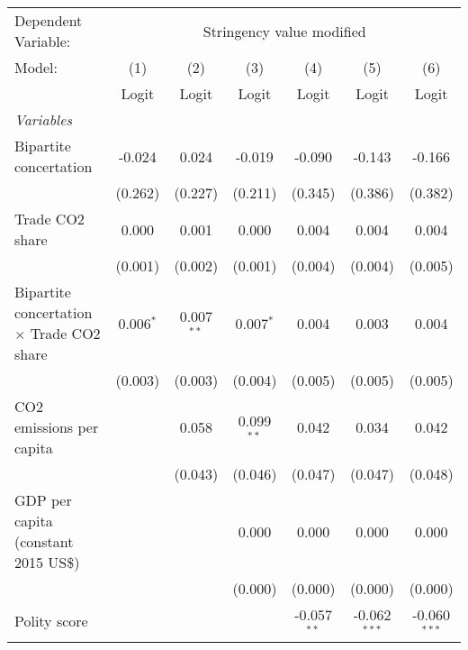 
\begingroup
\centering
\begin{tabular}{lcccccc}
   \toprule
   Dependent Variable: & \multicolumn{6}{c}{Stringency value modified}\\
   Model:                                           & (1)         & (2)          & (3)          & (4)           & (5)            & (6)\\  
                                                    &  Logit      & Logit        & Logit        & Logit         & Logit          & Logit\\  
   \midrule
   \emph{Variables}\\
   Bipartite concertation                           & -0.024      & 0.024        & -0.019       & -0.090        & -0.143         & -0.166\\   
                                                    & (0.262)     & (0.227)      & (0.211)      & (0.345)       & (0.386)        & (0.382)\\   
   Trade CO2 share                                  & 0.000       & 0.001        & 0.000        & 0.004         & 0.004          & 0.004\\   
                                                    & (0.001)     & (0.002)      & (0.001)      & (0.004)       & (0.004)        & (0.005)\\   
   Bipartite concertation $\times$ Trade CO2 share  & 0.006$^{*}$ & 0.007$^{**}$ & 0.007$^{*}$  & 0.004         & 0.003          & 0.004\\   
                                                    & (0.003)     & (0.003)      & (0.004)      & (0.005)       & (0.005)        & (0.005)\\   
   CO2 emissions per capita                         &             & 0.058        & 0.099$^{**}$ & 0.042         & 0.034          & 0.042\\   
                                                    &             & (0.043)      & (0.046)      & (0.047)       & (0.047)        & (0.048)\\   
   GDP per capita (constant 2015 US\$)              &             &              & 0.000        & 0.000         & 0.000          & 0.000\\   
                                                    &             &              & (0.000)      & (0.000)       & (0.000)        & (0.000)\\   
   Polity score                                     &             &              &              & -0.057$^{**}$ & -0.062$^{***}$ & -0.060$^{***}$\\   

\end{tabular}
